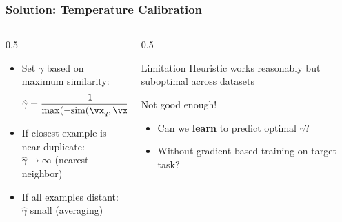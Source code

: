 \documentclass[
	10pt, %
	aspectratio=169, %
]{beamer}
\begin{document}
\begin{frame}
	\frametitle{Solution: Temperature Calibration}
	\begin{columns}[c]
		\begin{column}{0.5\textwidth}
			\begin{itemize}
				\item Set $\gamma$ based on maximum similarity:
				      \[
					      \hat{\gamma} = \frac{1}{\max(-\text{sim}(\vx_q, \vx_i))}
				      \]
				\item If closest example is near-duplicate:\\
				      $\hat{\gamma} \rightarrow \infty$ (nearest-neighbor)
				\item If all examples distant:\\
				      $\hat{\gamma}$ small (averaging)
			\end{itemize}
		\end{column}
		\begin{column}{0.5\textwidth}
			\begin{secondaryblock}{Limitation}
				Heuristic works reasonably but suboptimal across datasets
			\end{secondaryblock}
			\vspace{0.5em}
			Not good enough!
			\begin{itemize}
				\item Can we \textbf{learn} to predict optimal $\gamma$?
				\item Without gradient-based training on target task?
			\end{itemize}
		\end{column}
	\end{columns}
\end{frame}
\end{document}
